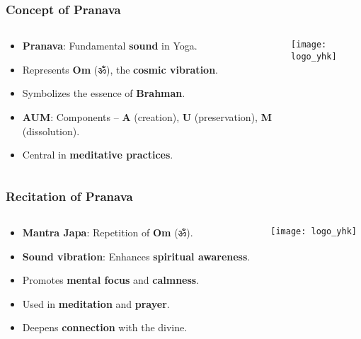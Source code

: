 \begin{frame}[fragile]\frametitle{Concept of Pranava}
\begin{columns}
    \begin{column}[T]{0.5\linewidth}
      \begin{itemize}
        \item \textbf{Pranava}: Fundamental \textbf{sound} in Yoga.
        \item Represents \textbf{Om} (ॐ), the \textbf{cosmic vibration}.
        \item Symbolizes the essence of \textbf{Brahman}.
        \item \textbf{AUM}: Components – \textbf{A} (creation), \textbf{U} (preservation), \textbf{M} (dissolution).
        \item Central in \textbf{meditative practices}.
      \end{itemize}
    \end{column}
    \begin{column}[T]{0.5\linewidth}
        \begin{center}
        \texttt{[image: logo\_yhk]}
        \end{center}	
    \end{column}
\end{columns}
\end{frame}

\begin{frame}[fragile]\frametitle{Recitation of Pranava}
\begin{columns}
    \begin{column}[T]{0.5\linewidth}
      \begin{itemize}
        \item \textbf{Mantra Japa}: Repetition of \textbf{Om} (ॐ).
        \item \textbf{Sound vibration}: Enhances \textbf{spiritual awareness}.
        \item Promotes \textbf{mental focus} and \textbf{calmness}.
        \item Used in \textbf{meditation} and \textbf{prayer}.
        \item Deepens \textbf{connection} with the divine.
      \end{itemize}
    \end{column}
    \begin{column}[T]{0.5\linewidth}
        \begin{center}
        \texttt{[image: logo\_yhk]}
        \end{center}	
    \end{column}
\end{columns}
\end{frame}


